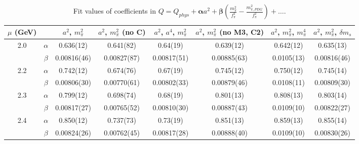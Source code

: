 \documentclass[12pt]{extarticle}
\begin{document}
\begin{table}[h!]
\begin{center}
\begin{tabular}{|c c|c|c|c|c|c|c|}
\hline
$\mu$ (GeV) &  & $a^2$, $m_\pi^2$& $a^2$, $m_\pi^2$ (no C)& $a^2$, $a^4$, $m_\pi^2$& $a^2$, $m_\pi^2$ (no M3, C2)& $a^2$, $m_\pi^2$, $m_\pi^4$& $a^2$, $m_\pi^2$, $\delta m_s$\\
\hline
\multirow{2}{0.5in}{2.0} & $\alpha$ & 0.636(12)& 0.641(82)& 0.64(19)& 0.639(12)& 0.642(12)& 0.635(13)\\
 & $\beta$ & 0.00816(46)& 0.00827(87)& 0.00817(51)& 0.00885(63)& 0.0105(13)& 0.00816(46)\\
\hline
\multirow{2}{0.5in}{2.2} & $\alpha$ & 0.742(12)& 0.674(76)& 0.67(19)& 0.745(12)& 0.750(12)& 0.745(14)\\
 & $\beta$ & 0.00806(30)& 0.00770(61)& 0.00802(33)& 0.00879(46)& 0.0108(11)& 0.00809(30)\\
\hline
\multirow{2}{0.5in}{2.3} & $\alpha$ & 0.799(12)& 0.698(74)& 0.68(19)& 0.801(13)& 0.808(13)& 0.803(14)\\
 & $\beta$ & 0.00817(27)& 0.00765(52)& 0.00810(30)& 0.00887(43)& 0.0109(10)& 0.00822(27)\\
\hline
\multirow{2}{0.5in}{2.4} & $\alpha$ & 0.850(12)& 0.737(73)& 0.73(19)& 0.851(13)& 0.859(13)& 0.855(14)\\
 & $\beta$ & 0.00824(26)& 0.00762(45)& 0.00817(28)& 0.00888(40)& 0.0109(10)& 0.00830(26)\\
\hline
\end{tabular}
\caption{Fit values of coefficients in $Q = Q_{phys} + \mathbf{\alpha} a^2 + \mathbf{\beta}\left(\frac{m_\pi^2}{f_\pi^2}-\frac{m_{\pi,PDG}^2}{f_\pi^2}\right) + \ldots$.}
\end{center}
\end{table}
























\clearpage
\end{document}
